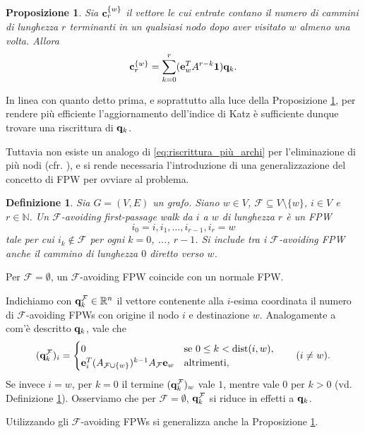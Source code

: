 \documentclass[a4paper]{article}
\newcommand{\dist}{{\rm dist}}
\newcommand{\NN}{\mathbb{N}}
\newcommand{\RR}{\mathbb{R}}
\newcommand{\evec}{{\bf e}}
\newcommand{\cvec}{{\bf c}}
\newcommand{\qvec}{{\bf q}}
\newcommand{\bone}{\mathbf{1}}
\newcommand{\cF}{\mathcal{F}}
\newcommand{\se}{\text{se }}
\newcommand{\altrimenti}{\text{altrimenti}}
\newtheorem{definition}{Definizione}
\newtheorem{proposition}{Proposizione}
\begin{document}
	\begin{proposition} \label{prop:crw_qk}
		Sia $\cvec_r^{\{w\}}$ il vettore le cui entrate contano il numero
		di cammini di lunghezza $r$ terminanti in un qualsiasi nodo
		dopo aver visitato $w$ almeno una volta. Allora
		\begin{equation}
			\cvec_r^{\{w\}} = \sum_{k=0}^r (\evec_w^T A^{r-k} \bone) \qvec_k.
		\end{equation}
	\end{proposition}
	
	In linea con quanto detto prima, e soprattutto alla luce della Proposizione \ref{prop:crw_qk}, per rendere più efficiente l'aggiornamento dell'indice
	di Katz è sufficiente dunque trovare una riscrittura di $\qvec_k$.
	
	Tuttavia non esiste un analogo di \eqref{eq:riscrittura_più_archi} per
	l'eliminazione di più nodi (cfr. \cite[p.~8]{katz2024}), e si rende
	necessaria l'introduzione di una generalizzazione del concetto di
	FPW per ovviare al problema.
	
	\begin{definition} \label{def:favoiding_fpw}
		Sia $G = (V, E)$ un grafo. Siano $w \in V$, $\cF \subseteq V \setminus \{w\}$, $i \in V$ e $r \in \NN$. Un $\cF$-avoiding first-passage walk da
		$i$ a $w$ di lunghezza $r$ è un FPW
		\[
			i_0 = i, i_1, \ldots, i_{r-1},  i_r = w
		\]
		tale per cui $i_k \notin \cF$ per ogni $k = 0$, ..., $r-1$. Si include
		tra i $\cF$-avoiding FPW anche il cammino di lunghezza $0$ diretto
		verso $w$.
	\end{definition}
	
	Per $\cF = \emptyset$, un  $\cF$-avoiding FPW coincide con un normale FPW.
	
	Indichiamo con $\qvec_k^\cF \in \RR^n$ il vettore contenente alla $i$-esima
	coordinata il numero di $\cF$-avoiding FPWs con origine il nodo $i$ e
	destinazione $w$. Analogamente a com'è descritto $\qvec_k$, vale che
	\[
		(\qvec_k^\cF)_i = \begin{cases}
		0 & \se 0 \leq k < \dist(i, w), \\
		\evec_i^T (A_{\cF \cup \{w\}})^{k-1} A_\cF \evec_w & \altrimenti,
		\end{cases} \qquad (i \neq w).
	\]
	Se invece $i = w$, per $k=0$ il termine $(\qvec_k^\cF)_w$ vale $1$, mentre vale $0$ per $k>0$ (vd. Definizione \ref{def:favoiding_fpw}). Osserviamo che per $\cF = \emptyset$, $\qvec_k^\cF$ si riduce in effetti a $\qvec_k$.
	
	Utilizzando gli $\cF$-avoiding FPWs si generalizza anche la Proposizione \ref{prop:crw_qk}.
	
\end{document}
